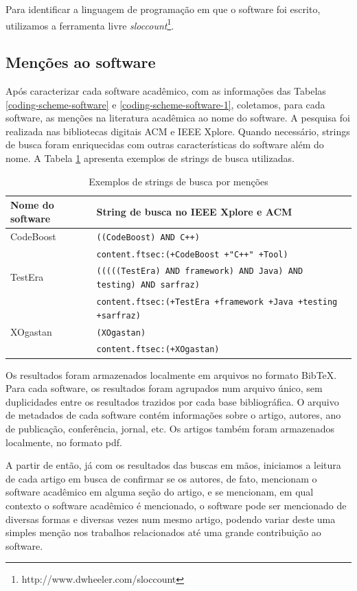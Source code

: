 Para identificar a linguagem de programação em que o software foi escrito, utilizamos a
ferramenta livre {\it sloccount}\footnote{http://www.dwheeler.com/sloccount}.

\subsection{Menções ao software}

Após caracterizar cada software acadêmico, com as informações das Tabelas
\ref{coding-scheme-software} e \ref{coding-scheme-software-1}, 
coletamos, para cada software, as menções na literatura acadêmica ao nome do software.
A pesquisa foi realizada nas bibliotecas digitais ACM e IEEE Xplore. 
Quando necessário, strings de busca foram enriquecidas com outras
características do software além do nome.  
A Tabela \ref{exemplos-strings} apresenta exemplos de strings de busca utilizadas.

\begin{table}[h]
\caption{Exemplos de strings de busca por menções}
\centering
\begin{tabular}{ l p{10cm} }
  \hline
  Nome do software   & String de busca no IEEE Xplore e ACM \\
  \hline
  CodeBoost          & {\tt ((CodeBoost) AND C++)} \\
                     & {\tt content.ftsec:(+CodeBoost +"C++" +Tool)} \\
  \hline
  TestEra            & {\tt (((((TestEra) AND framework) AND Java) AND testing) AND sarfraz)} \\
                     & {\tt content.ftsec:(+TestEra +framework +Java +testing +sarfraz)} \\
  \hline
  XOgastan           & {\tt (XOgastan)} \\
                     & {\tt content.ftsec:(+XOgastan)} \\
  \hline
\end{tabular}
\label{exemplos-strings}
\end{table}

Os resultados foram armazenados localmente em arquivos no formato BibTeX.
Para cada software, os resultados foram agrupados num arquivo único, sem duplicidades
entre os resultados trazidos por cada base bibliográfica. 
O arquivo de metadados de cada software contém informações sobre 
o artigo, autores, ano de publicação, conferência, jornal, etc.
Os artigos também foram armazenados localmente, no formato pdf.

A partir de então, já com os resultados das buscas em mãos, iniciamos a leitura
de cada artigo em busca de confirmar se os autores, de fato, mencionam o
software acadêmico em alguma seção do artigo, e se mencionam, em qual contexto
o software acadêmico é mencionado, o software pode ser mencionado de diversas
formas e diversas vezes num mesmo artigo, podendo variar deste uma simples
menção nos trabalhos relacionados até uma grande contribuição ao software.

